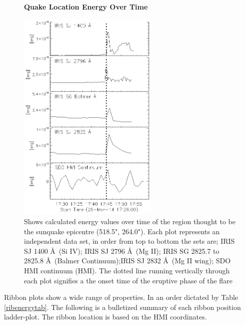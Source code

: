 \begin{figure}[H]
  \begin{center}
  \textbf{Quake Location Energy Over Time}\par\medskip
  \includegraphics[width=0.6\textwidth]{29-Mar-14-Quake-Energy-Ladder}
  \end{center}
  \caption{Shows calculated energy values over time of the region thought to be the sunquake epicentre (518.5", 264.0"). Each plot represents an independent data set, in order from top to bottom the sets are; IRIS SJ 1400 \AA\ (Si IV); IRIS SJ 2796 \AA\ (Mg II); IRIS SG  2825.7 to 2825.8 \AA\ (Balmer Continuum);IRIS SJ 2832 \AA\ (Mg II wing); SDO HMI continuum (HMI). The dotted line running vertically through each plot signifies a the onset time of the eruptive phase of the flare}\label{eqk}
\end{figure}

Ribbon plots show a wide range of properties. In an order dictated by Table \ref{ribenergytab}. The following is a bulletized summary of each ribbon position ladder-plot. The ribbon location is based on the HMI coordinates.

